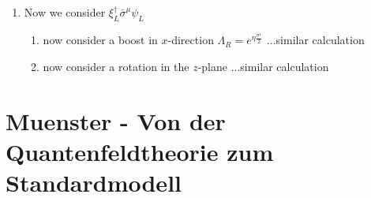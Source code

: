 \documentclass[../main.tex]{subfiles}
\begin{document}
\begin{enumerate}
\begin{enumerate}
\begin{align}
\begin{matrix}
i&0&0&0\\
0&0&0&0\\
0&0&0&0
\end{matrix}\right)\xi_R^\dagger\sigma^\mu\psi_R\\
&=(1-i\eta_1 K_1)^\nu_{\;\mu}\xi_R^\dagger\sigma^\mu\psi_R\\
&\simeq\Lambda^\nu_{\;\mu} \,\xi_R^\dagger\sigma^\mu\psi_R
\end{align}
\item now consider a rotation in the $z$-plane
...similar calculation
\end{enumerate}
\item Now we consider $\xi_L^\dagger\bar{\sigma}^\mu\psi_L$
\begin{enumerate}
\item now consider a boost in $x$-direction $\Lambda_R=e^{\eta\frac{\sigma^1}{2}}$
...similar calculation
\item now consider a rotation in the $z$-plane
...similar calculation
\end{enumerate}

\end{enumerate}



\section{{\sc Muenster} - Von der Quantenfeldtheorie zum Standardmodell} 
\end{document}
